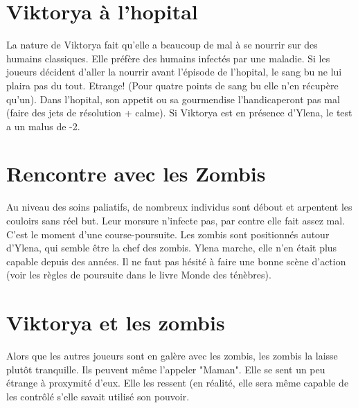 \documentclass[oneside,12pt]{book}
\begin{document}
\begin{flushleft}
\section{Viktorya à l'hopital}
La nature de Viktorya fait qu'elle a beaucoup de mal à se nourrir sur des humains classiques.
Elle préfère des humains infectés par une maladie.
Si les joueurs décident d'aller la nourrir avant l'épisode de l'hopital, le sang bu ne lui plaira pas du tout. Etrange! (Pour quatre points de sang bu elle n'en récupère qu'un).
Dans l'hopital, son appetit ou sa gourmendise l'handicaperont pas mal (faire des jets de résolution + calme). Si Viktorya est en présence d'Ylena, le test a un malus de -2.

\section{Rencontre avec les Zombis}
Au niveau des soins paliatifs, de nombreux individus sont débout et arpentent les couloirs sans réel but. Leur morsure n'infecte pas, par contre elle fait assez mal. C'est le moment d'une course-poursuite. Les zombis sont positionnés autour d'Ylena, qui semble être la chef des zombis.
Ylena marche, elle n'en était plus capable depuis des années.
Il ne faut pas hésité à faire une bonne scène d'action (voir les règles de poursuite dans le livre Monde des ténèbres). 

\section{Viktorya et les zombis}
Alors que les autres joueurs sont en galère avec les zombis, les zombis la laisse plutôt tranquille. Ils peuvent même l'appeler "Maman".
Elle se sent un peu étrange à proxymité d'eux. Elle les ressent (en réalité, elle sera même capable de les contrôlé s'elle savait utilisé son pouvoir.



\end{flushleft}
\end{document}
